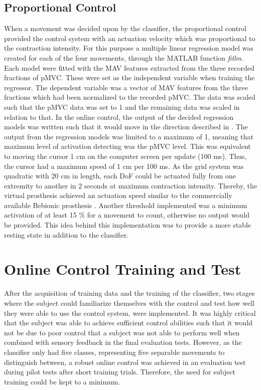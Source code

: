 \subsection{Proportional Control}  
When a movement was decided upon by the classifier, the proportional control provided the control system with an actuation velocity which was proportional to the contraction intensity. For this purpose a multiple linear regression model was created for each of the four movements, through the MATLAB function \textit{fitlm}. Each model were fitted with the MAV features extracted from the three recorded fractions of pMVC. These were set as the independent variable when training the regressor. The dependent variable was a vector of MAV features from the three fractions which had been normalized to the recorded pMVC. The data was scaled such that the pMVC data was set to 1 and the remaining data was scaled in relation to that. In the online control, the output of the decided regression models was written such that it would move in the direction described in . The output from the regression models was limited to a maximum of 1, meaning that maximum level of activation detecting was the pMVC level. This was equivalent to moving the cursor 1 cm on the computer screen per update (100 ms). Thus, the cursor had a maximum speed of 1 cm per 100 ms. As the grid system was quadratic with 20 cm in length, each DoF could be actuated fully from one extremity to another in 2 seconds at maximum contraction intensity. Thereby, the virtual prosthesis achieved an actuation speed similar to the commercially available Bebionic prosthesis \cite{Belter2013}.  Another threshold implemented was a minimum activation of at least 15 $\percent$ for a movement to count, otherwise no output would be provided. This idea behind this implementation was to provide a more stable resting state in addition to the classifier. 


\section{Online Control Training and Test} \label{sec:meth:contraintest}

After the acquisition of training data and the training of the classifier, two stages where the subject could familiarize themselves with the control and test how well they were able to use the control system, were implemented. It was highly critical that the subject was able to achieve sufficient control abilities such that it would not be due to poor control that a subject was not able to perform well when combined with sensory feedback in the final evaluation tests. However, as the classifier only had five classes, representing five separable movements to distinguish between, a robust online control was achieved in an evaluation test during pilot tests after short training trials. Therefore, the need for subject training could be kept to a minimum.  

